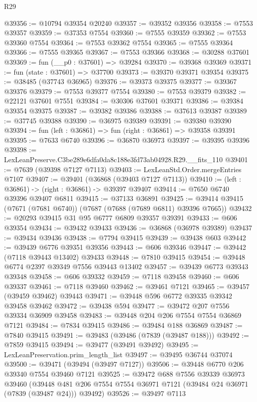 \begin{lexlean}{R29}
\begin{coremodule}
@39356 := @10794 @39354 @20240
@39357 := @39352 @39356
@39358 := @7553 @39357
@39359 := @37353 @7554
@39360 := @7555 @39359
@39362 := @7553 @39360 @7554
@39364 := @7553 @39362 @7554
@39365 := @7555 @39364
@39366 := @7555 @39365
@39367 := @7553 @39366
@39368 := @30288 @37601
@39369 := fun (__p0 : @37601) => @39284
@39370 := @39368 @39369
@39371 := fun (state : @37601) => @37700
@39373 := @39370 @39371 @39354
@39375 := @38485 (@37743 @36965)
@39376 := @39373 @39375
@39377 := @39367 @39376
@39379 := @7553 @39377 @7554
@39380 := @7553 @39379
@39382 := @22121 @37601 @7551
@39384 := @30306 @37601 @39371
@39386 := @39384 @39354 @39375
@39387 := @39382 @39386
@39388 := @37613 @39387
@39389 := @37745 @39388
@39390 := @36975 @39389
@39391 := @39380 @39390
@39394 := fun (left : @36861) => fun (right : @36861) => @39358 @39391
@39395 := @7633 @6740
@39396 := @36870 @36973
@39397 := @39395 @39396
@39398 := LexLeanPreserve.C3be289e6dfa0da8c188e3fd73ab04928.R29.__fits_110
@39401 := @7639 (@39398 @7127 @7113)
@39403 := LexLeanStd.Order.mergeEntries @7107
@39407 := @39401 (@36868 (@39403 @7127 @7113))
@39410 := (left : @36861) -> (right : @36861) -> @39397 @39407
@39414 := @7650 @6740 @39396 @39407 @6811
@39415 := @37133 @36891
@39425 := @39414 @39415 (@7671 (@7681 @6740)) (@7687 (@7688 (@7689 @6811) @39396 @7665))
@39432 := @20293 @39415 @31 @95 @6777 @6809 @39357 @39391
@39433 := @606 @39354
@39434 := @39432 @39433
@39436 := @36868 (@36978 @39389)
@39437 := @39434 @39436
@39438 := @7794 @39415
@39439 := @39438 @603
@39442 := @39439 @6776 @39351 @39356
@39443 := @606 @39346
@39447 := @39442 (@7118 @39443 @13402) @39433
@39448 := @7810 @39415
@39454 := @39448 @6774 @2397 @39349 @7556 @39443 @13402
@39457 := @39439 @6773 @39343 @39348
@39458 := @606 @39332
@39459 := @7118 @39458
@39460 := @606 @39337
@39461 := @7118 @39460
@39462 := @39461 @7121
@39465 := @39457 (@39459 @39462) @39443
@39471 := @39448 @596 @6772 @39335 @39342 @39458 @39462
@39472 := @39438 @594
@39477 := @39472 @207 @7556 @39334 @36909 @39458
@39483 := @39448 @204 @206 @7554 @7554 @36869 @7121
@39484 := @7834 @39415
@39486 := @39484 @188 @36869
@39487 := @7840 @39415
@39491 := @39483 (@39486 (@7839 (@39487 @188)))
@39492 := @7859 @39415
@39494 := @39477 (@39491 @39492)
@39495 := LexLeanPreservation.prim_length_list
@39497 := @39495 @36744 @37074
@39500 := @39471 (@39494 (@39497 @7127))
@39506 := @39448 @6770 @206 @39340 @7554 @39460 @7121
@39525 := @39472
    @688
    @7556
    @39339
    @36973
    @39460
    (@39448 @481 @206 @7554 @7554 @36971 @7121 (@39484 @24 @36971 (@7839 (@39487 @24))) @39492)
@39526 := @39497 @7113

\end{coremodule}
\end{lexlean}
